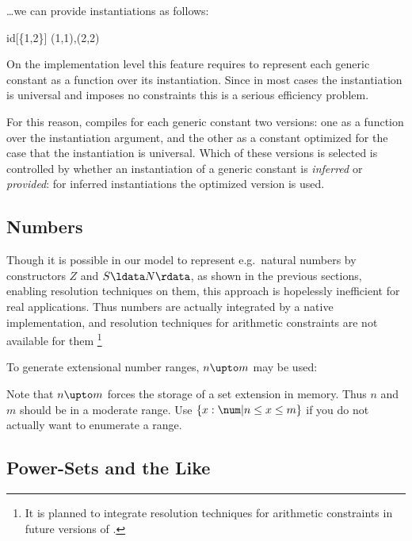 \documentclass{article}
\begin{document}
\ldots we can provide instantiations as follows:

\begin{zexecexpr}
  id[\{1,2\}]
\yields  
{(1,1),(2,2)}
\end{zexecexpr}

On the implementation level this feature requires to represent each
generic constant as a function over its instantiation. Since in most
cases the instantiation is universal and imposes no 
constraints this is a serious efficiency problem.

For this reason, \ZAP{} compiles for each generic constant two
versions: one as a function over the instantiation argument, and the
other as a constant optimized for the case that the instantiation is
universal.  Which of these versions is selected is controlled by
whether an instantiation of a generic constant is \emph{inferred} or
\emph{provided}: for inferred instantiations the optimized version is
used.

\subsection{Numbers}

Though it is possible in our model to represent e.g.~natural numbers
by constructors $Z$ and $S \ldata N \rdata$, as shown in the previous
sections, enabling resolution techniques on them, this approach is
hopelessly inefficient for real applications.  Thus numbers are
actually integrated by a native implementation, and resolution
techniques for arithmetic constraints are not available for them
\footnote{It is planned to integrate resolution techniques for
  arithmetic constraints in future versions of \ZAP{}.}

To generate extensional number ranges, $n \upto m$ may be used:


Note that $n \upto m$ forces the storage of a set extension
in memory. Thus $n$ and $m$ should be in a moderate range.
Use $\{x:\num|n \leq x \leq m\}$ if you do not actually want
to enumerate a range.


\subsection{Power-Sets and the Like}
\end{document}
